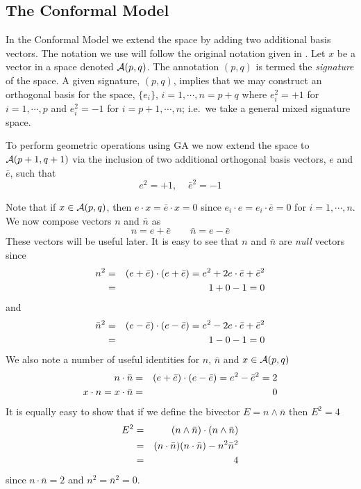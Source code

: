 \subsection{The Conformal Model}

In the Conformal Model \cite{hestenes2} we extend the space by adding two 
additional basis
vectors. 
The notation we use will follow the original notation given in
\cite{HS84}. Let $x$ be a vector in a space denoted ${\mathcal{A}}(p,q)$.
The annotation $(p,q)$ is termed the \emph{signature} of the space. 
A given signature, $(p,q)$, implies that we may construct an 
orthogonal basis for the space,
$\{e_i\}$, $i=1,\cdots,n=p+q$ where $e_i^2=+1$ for $i=1,\cdots,p$
and $e_i^2=-1$ for $i=p+1,\cdots,n$; i.e.\ we take a general mixed
signature space.  

To perform geometric operations using GA we now extend the space 
to ${\mathcal{A}}(p+1,q+1)$ via the inclusion of two additional orthogonal
basis  vectors, $e$ and
$\bar{e}$, such that
%
\[  e^2=+1,\;\;\;\; \bar{e}^2= -1
\]
%

Note that if $x \in {\mathcal{A}}(p,q)$, then $e\cdot x =
\bar{e}\cdot x = 0$ since $e_i\cdot e=e_i \cdot \bar{e} = 0$
for $i=1,\cdots,n$. We now compose vectors $n$ and
$\bar{n}$ as
%
\[ n = e + \bar{e}  \qquad  \bar{n} = e - \bar{e} 
\label{nequations}
\]
%
These vectors will be useful later. It is easy to see that
$n$ and $\bar{n}$ are \emph{null} vectors since
%
\begin{eqnarray}
n^2  & = & (e + \bar{e})\cdot(e + \bar{e}) = e^2 + 2e\cdot\bar{e} + \bar{e}^2 \nonumber \\
       & = &  1 + 0 - 1 = 0  \nonumber
\end{eqnarray}
and
\begin{eqnarray}
\bar{n}^2  & = & (e - \bar{e})\cdot(e - \bar{e}) = e^2 - 2e\cdot\bar{e} + \bar{e}^2 \nonumber \\
       & = &  1 - 0 - 1 = 0     \nonumber
\end{eqnarray}
%
We also note a number of useful identities for $n$, $\bar{n}$ and $x \in \mathcal{A}(p,q)$
%
\begin{eqnarray}
n\cdot\bar{n} & = & (e + \bar{e})\cdot(e - \bar{e}) = e^2 - \bar{e}^2 = 2 \nonumber \\
x\cdot n = x\cdot \bar{n} & = & 0 \nonumber 
\end{eqnarray}
%
It is equally easy to show that if we define the bivector $E = n \wedge \bar{n}$ 
then $E^2 = 4$
%
\begin{eqnarray}
  E^2 & = &  (n\wedge \bar{n})\cdot(n\wedge \bar{n}) \nonumber \\
  & = &  (n\cdot\bar{n})(n\cdot\bar{n}) - n^2 \bar{n}^2 \nonumber \\
  & = &  4
  \end{eqnarray}
since $n\cdot\bar{n}=2$ and $n^2=\bar{n}^2=0$.

